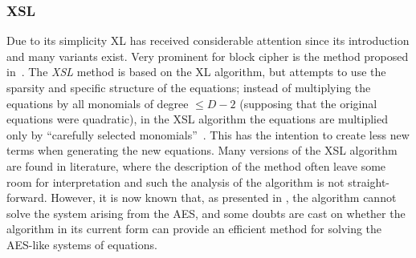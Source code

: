 \subsubsection{XSL}
Due to its simplicity XL has received considerable attention since its introduction and many variants exist. Very prominent for block cipher is the method proposed in~\cite{courtois-pieprzyk:asiacrypt02}. The \emph{XSL} method is based on the XL algorithm, but attempts to use the sparsity and specific structure of the equations; instead of multiplying the equations by all monomials of degree
$\leq D-2$ (supposing that the original equations were quadratic), in the XSL algorithm the equations are multiplied only by ``carefully selected monomials''~\cite{courtois-pieprzyk:asiacrypt02}. This has the intention to create less new terms when generating the new equations. Many versions of the XSL algorithm are found in literature, where the description of the method often leave some room for interpretation and such the analysis of the algorithm is not straight-forward. However, it is now known \cite{Cid2005a,lim-khoo:fse2007} that, as presented in \cite{courtois-pieprzyk:asiacrypt02}, the algorithm cannot solve the system arising from the AES, and some doubts are cast on whether the algorithm in its current form can provide an efficient method for solving the AES-like systems of equations.

